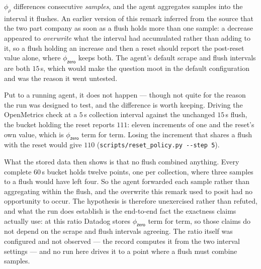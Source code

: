 \begin{remark}\label{rem:flush}
$\phi_\rho$ differences consecutive \emph{samples}, and the agent aggregates samples
into the interval it flushes. An earlier version of this remark inferred from the source
that the two part company as soon as a flush holds more than one sample: a decrease
appeared to \emph{overwrite} what the interval had accumulated rather than adding to it,
so a flush holding an increase and then a reset should report the post-reset value alone,
where $\phi_{\mathsf{zero}}$ keeps both. The agent's default scrape and flush intervals
are both $15$\,s, which would make the question moot in the default configuration and
was the reason it went untested.

Put to a running agent, it does not happen --- though not quite for the reason the run
was designed to test, and the difference is worth keeping. Driving the OpenMetrics
check at a $5$\,s collection interval against the unchanged $15$\,s flush, the bucket
holding the reset reports $111$: eleven increments of one and the reset's own value,
which is $\phi_{\mathsf{zero}}$ term for term. Losing the increment that shares a flush
with the reset would give $110$ (\texttt{scripts\slash reset\_policy.py -{}-step 5}).

What the stored data then shows is that no flush combined anything. Every complete
$60$\,s bucket holds twelve points, one per collection, where three samples to a flush
would have left four. So the agent forwarded each sample rather than aggregating within
the flush, and the overwrite this remark used to posit had no opportunity to occur. The
hypothesis is therefore unexercised rather than refuted, and what the run does
establish is the end-to-end fact the exactness claims actually use: at this ratio
Datadog stores $\phi_{\mathsf{zero}}$ term for term, so those claims do not depend on
the scrape and flush intervals agreeing. The ratio itself was configured and not
observed --- the record computes it from the two interval settings --- and no run here
drives it to a point where a flush must combine samples.
\end{remark}
